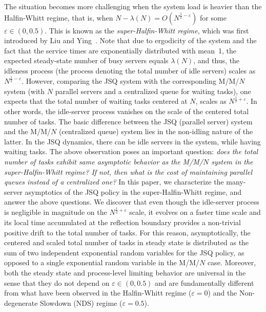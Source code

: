\documentclass[11pt, reqno]{article}
\numberwithin{equation}{section}
\numberwithin{theorem}{section}
\newcommand\blue[1]{#1}
\begin{document}
The situation becomes more challenging 
when the system load is heavier than the Halfin-Whitt regime, that is, when $N-\lambda(N) = O(N^{\frac{1}{2} - \varepsilon})$ for some $\varepsilon\in (0, 0.5)$.
This is known as the \emph{super-Halfin-Whitt regime}\blue{, which was first introduced by Liu and Ying~\cite{LY21}}.
Note that due to ergodicity of the system and the fact that the service times are exponentially distributed with mean~1, the expected steady-state number of busy servers equals $\lambda(N)$, and thus, the idleness process (the process denoting the total number of idle servers) scales as $N^{\frac{1}{2} - \varepsilon}$.
However, comparing the JSQ system with the corresponding M/M/$N$ system \blue{(with $N$ parallel servers and a centralized queue for waiting tasks)}, one expects that the total number of waiting tasks centered at $N$, scales as  $N^{\frac{1}{2} + \varepsilon}$.
In other words, 
the idle-server process vanishes on the scale of the centered total number of tasks. 
The basic difference between the JSQ (parallel server) system and \blue{the M/M/$N$ (centralized queue) system} lies in the non-idling nature of the latter.
In the JSQ dynamics, there can be idle servers in the system, while having waiting tasks. 
The above observation poses an important question:
\emph{does the total number of tasks exhibit same asymptotic behavior as the M/M/$N$ system in the super-Halfin-Whitt regime? 
If not, then what is the cost of maintaining parallel queues instead of a centralized one?}
In this paper, we characterize the many-server asymptotics of the JSQ policy in the super-Halfin-Whitt regime, and answer the above questions. 
We discover that  even though the idle-server process is negligible in magnitude on the $N^{\frac{1}{2} + \varepsilon}$ scale, it evolves on a faster time scale and its local time accumulated at the reflection boundary provides a non-trivial positive drift to the total number of tasks.
For this reason, asymptotically, the centered and scaled total number of tasks in steady state is distributed as the sum of two independent exponential random variables for the JSQ policy, as opposed to a single exponential random variable in the M/M/$N$ case.
Moreover, both the steady state and process-level limiting behavior are universal in the sense that they do not depend on $\varepsilon \in (0, 0.5)$ and are fundamentally different from what have been observed in the Halfin-Whitt regime ($\varepsilon = 0$) and the Non-degenerate Slowdown (NDS) regime ($\varepsilon=0.5$).
\end{document}
